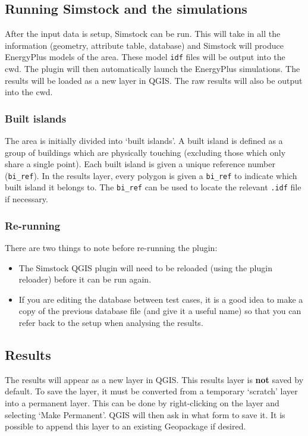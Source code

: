 \documentclass{article}
\begin{document}
\subsection{Running Simstock and the simulations}
After the input data is setup, Simstock can be run. This will take in all the information (geometry, attribute table, database) and Simstock will produce EnergyPlus models of the area. These model \texttt{idf} files will be output into the cwd. The plugin will then automatically launch the EnergyPlus simulations. The results will be loaded as a new layer in QGIS. The raw results will also be output into the cwd.

\subsubsection{Built islands}
The area is initially divided into `built islands'. A built island is defined as a group of buildings which are physically touching (excluding those which only share a single point). Each built island is given a unique reference number (\texttt{bi\_ref}). In the results layer, every polygon is given a \texttt{bi\_ref} to indicate which built island it belongs to. The \texttt{bi\_ref} can be used to locate the relevant \texttt{.idf} file if necessary.

\subsubsection{Re-running}
There are two things to note before re-running the plugin:
\begin{itemize}
    \item The Simstock QGIS plugin will need to be reloaded (using the plugin reloader) before it can be run again.
    \item If you are editing the database between test cases, it is a good idea to make a copy of the previous database file (and give it a useful name) so that you can refer back to the setup when analysing the results.
\end{itemize}

\subsection{Results}
The results will appear as a new layer in QGIS. This results layer is \textbf{not} saved by default. To save the layer, it must be converted from a temporary `scratch' layer into a permanent layer. This can be done by right-clicking on the layer and selecting `Make Permanent'. QGIS will then ask in what form to save it. It is possible to append this layer to an existing Geopackage if desired. \\
\end{document}

